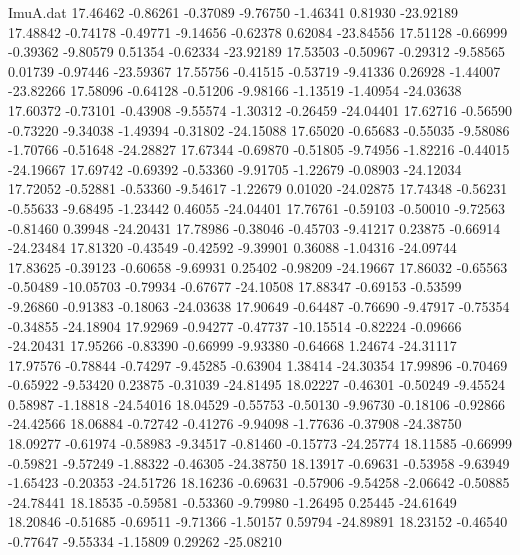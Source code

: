 \begin{filecontents}{ImuA.dat}
  17.46462   -0.86261   -0.37089   -9.76750   -1.46341    0.81930  -23.92189
  17.48842   -0.74178   -0.49771   -9.14656   -0.62378    0.62084  -23.84556
  17.51128   -0.66999   -0.39362   -9.80579    0.51354   -0.62334  -23.92189
  17.53503   -0.50967   -0.29312   -9.58565    0.01739   -0.97446  -23.59367
  17.55756   -0.41515   -0.53719   -9.41336    0.26928   -1.44007  -23.82266
  17.58096   -0.64128   -0.51206   -9.98166   -1.13519   -1.40954  -24.03638
  17.60372   -0.73101   -0.43908   -9.55574   -1.30312   -0.26459  -24.04401
  17.62716   -0.56590   -0.73220   -9.34038   -1.49394   -0.31802  -24.15088
  17.65020   -0.65683   -0.55035   -9.58086   -1.70766   -0.51648  -24.28827
  17.67344   -0.69870   -0.51805   -9.74956   -1.82216   -0.44015  -24.19667
  17.69742   -0.69392   -0.53360   -9.91705   -1.22679   -0.08903  -24.12034
  17.72052   -0.52881   -0.53360   -9.54617   -1.22679    0.01020  -24.02875
  17.74348   -0.56231   -0.55633   -9.68495   -1.23442    0.46055  -24.04401
  17.76761   -0.59103   -0.50010   -9.72563   -0.81460    0.39948  -24.20431
  17.78986   -0.38046   -0.45703   -9.41217    0.23875   -0.66914  -24.23484
  17.81320   -0.43549   -0.42592   -9.39901    0.36088   -1.04316  -24.09744
  17.83625   -0.39123   -0.60658   -9.69931    0.25402   -0.98209  -24.19667
  17.86032   -0.65563   -0.50489  -10.05703   -0.79934   -0.67677  -24.10508
  17.88347   -0.69153   -0.53599   -9.26860   -0.91383   -0.18063  -24.03638
  17.90649   -0.64487   -0.76690   -9.47917   -0.75354   -0.34855  -24.18904
  17.92969   -0.94277   -0.47737  -10.15514   -0.82224   -0.09666  -24.20431
  17.95266   -0.83390   -0.66999   -9.93380   -0.64668    1.24674  -24.31117
  17.97576   -0.78844   -0.74297   -9.45285   -0.63904    1.38414  -24.30354
  17.99896   -0.70469   -0.65922   -9.53420    0.23875   -0.31039  -24.81495
  18.02227   -0.46301   -0.50249   -9.45524    0.58987   -1.18818  -24.54016
  18.04529   -0.55753   -0.50130   -9.96730   -0.18106   -0.92866  -24.42566
  18.06884   -0.72742   -0.41276   -9.94098   -1.77636   -0.37908  -24.38750
  18.09277   -0.61974   -0.58983   -9.34517   -0.81460   -0.15773  -24.25774
  18.11585   -0.66999   -0.59821   -9.57249   -1.88322   -0.46305  -24.38750
  18.13917   -0.69631   -0.53958   -9.63949   -1.65423   -0.20353  -24.51726
  18.16236   -0.69631   -0.57906   -9.54258   -2.06642   -0.50885  -24.78441
  18.18535   -0.59581   -0.53360   -9.79980   -1.26495    0.25445  -24.61649
  18.20846   -0.51685   -0.69511   -9.71366   -1.50157    0.59794  -24.89891
  18.23152   -0.46540   -0.77647   -9.55334   -1.15809    0.29262  -25.08210

\end{filecontents}
